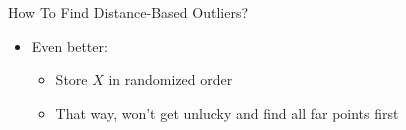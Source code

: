 \documentclass[aspectratio=169]{beamer}
\begin{document}
\begin{frame}{How To Find Distance-Based Outliers?}

\begin{itemize}
\item Even better:
	\begin{itemize}
	\item Store $X$ in randomized order
	\item That way, won't get unlucky and find all far points first
	\end{itemize}
\end{itemize}




\end{frame}
%
\end{document}
